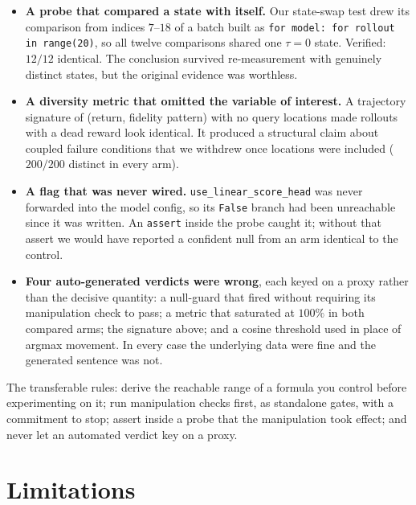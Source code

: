 \documentclass[11pt]{article}
\begin{document}
\begin{itemize}\itemsep2pt
\item \textbf{A probe that compared a state with itself.} Our state-swap test
drew its comparison from indices $7$--$18$ of a batch built as
\texttt{for model: for rollout in range(20)}, so all twelve comparisons shared
one $\tau{=}0$ state. Verified: $12/12$ identical. The conclusion survived
re-measurement with genuinely distinct states, but the original evidence was
worthless.
\item \textbf{A diversity metric that omitted the variable of interest.} A
trajectory signature of (return, fidelity pattern) with no query locations
made rollouts with a dead reward look identical. It produced a structural claim
about coupled failure conditions that we withdrew once locations were included
($200/200$ distinct in every arm).
\item \textbf{A flag that was never wired.} \texttt{use\_linear\_score\_head}
was never forwarded into the model config, so its \texttt{False} branch had been
unreachable since it was written. An \texttt{assert} inside the probe caught it;
without that assert we would have reported a confident null from an arm
identical to the control.
\item \textbf{Four auto-generated verdicts were wrong}, each keyed on a proxy
rather than the decisive quantity: a null-guard that fired without requiring its
manipulation check to pass; a metric that saturated at $100\%$ in both compared
arms; the signature above; and a cosine threshold used in place of argmax
movement. In every case the underlying data were fine and the generated sentence
was not.
\end{itemize}

The transferable rules: derive the reachable range of a formula you control
before experimenting on it; run manipulation checks first, as standalone gates,
with a commitment to stop; assert inside a probe that the manipulation took
effect; and never let an automated verdict key on a proxy.

\section{Limitations}
\end{document}
